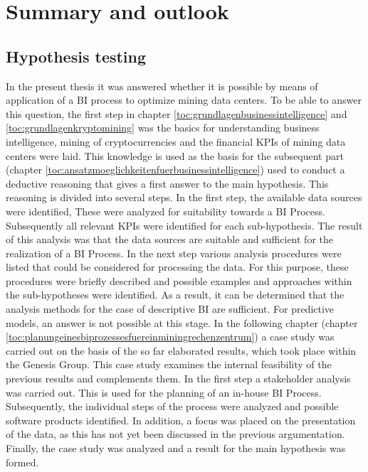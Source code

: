 \newpage
\section{Summary and outlook} \label{toc:zusammenfassungundausblick}

\subsection{Hypothesis testing} \label{toc:ueberpruefungderhypothesen}

In the present thesis it was answered whether it is possible by means of application of a \ac{BI} process to optimize
mining data centers. To be able to answer this question, the first step in chapter
\ref{toc:grundlagenbusinessintelligence} and \ref{toc:grundlagenkryptomining} was the basics for understanding
business intelligence, mining of cryptocurrencies and the financial \acp{KPI} of mining data centers were laid.
This knowledge is used as the basis for the subsequent part (chapter \ref{toc:ansatzmoeglichkeitenfuerbusinessintelligence})
used to conduct a deductive reasoning that gives a first answer to the main hypothesis.
This reasoning is divided into several steps. In the first step, the available data sources were identified,
These were analyzed for suitability towards a \ac{BI} Process. Subsequently
all relevant \acp{KPI} were identified for each sub-hypothesis. The result of this analysis was that
the data sources are suitable and sufficient for the realization of a \ac{BI} Process. In the next step
various analysis procedures were listed that could be considered for processing the data.
For this purpose, these procedures were briefly described and possible examples and approaches within the sub-hypotheses were
identified. As a result, it can be determined that the analysis methods for the case of descriptive
\ac{BI} are sufficient. For predictive models, an answer is not possible at this stage. In the following chapter
(chapter \ref{toc:planungeinesbiprozessesfuereinminingrechenzentrum}) a case study was carried out on the basis of the so far elaborated
results, which took place within the Genesis Group. This case study
examines the internal feasibility of the previous results and complements them. In the first step
a stakeholder analysis was carried out. This is used for the planning of an in-house \ac{BI} Process.
Subsequently, the individual steps of the process were analyzed and possible software products identified.
In addition, a focus was placed on the presentation of the data, as this has not yet been discussed in the previous argumentation.
Finally, the case study was analyzed and a result for the main hypothesis was formed.

